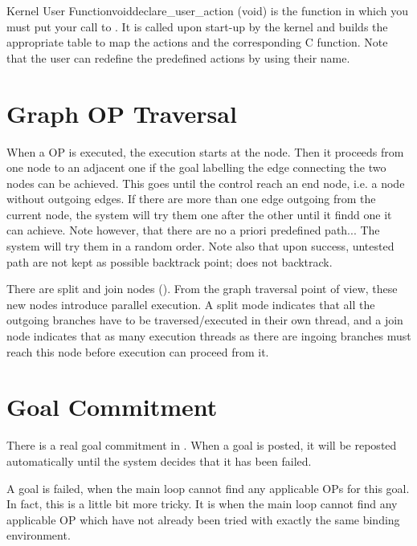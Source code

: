 \begin{typefn}{Kernel User Function}{void}{declare\_user\_action} {(void)}
is the function in which you must put your call to
. It is called upon start-up by the kernel and
builds the appropriate table to map the actions and the corresponding C
function.  Note that the user can redefine the predefined actions by using
their name.
\end{typefn}

\section{Graph OP Traversal}

When a OP is executed, the execution starts at the  node.
Then it proceeds from one node to an adjacent one if the goal labelling
the edge connecting the two nodes can be achieved. This goes until the
control reach an end node, i.e. a node without outgoing edges. If there
are more than one edge outgoing from the current node, the system will
try them one after the other until it findd one it can achieve. Note
however, that there are no a priori predefined path... The system will
try them in a random order. Note also that upon success, untested path
are not kept as possible backtrack point; \CPK{} does not backtrack.

There are split and join nodes ().  From the graph traversal point of view, these new nodes introduce
parallel execution. A split mode indicates that all the outgoing branches have
to be traversed/executed in their own thread, and a join node indicates that as
many execution threads as there are ingoing branches must reach this node
before execution can proceed from it.


\section{Goal Commitment}

There is a real goal commitment in \COPRS{}. When a goal is posted, it will be
reposted automatically until the system decides that it has been failed.

A goal is failed, when the main loop cannot find any applicable OPs
for this goal. In fact, this is a little bit more tricky. It is when the
main loop cannot find any applicable OP which have not already been tried
with exactly the same binding environment.

